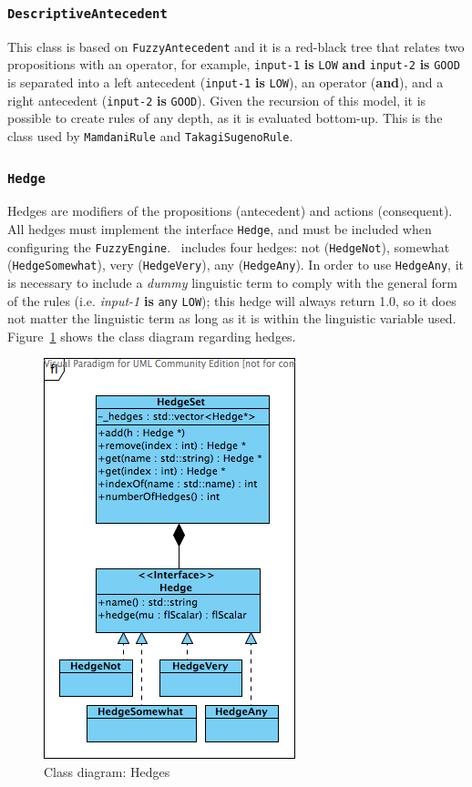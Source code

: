 			
		\subsubsection{\texttt{DescriptiveAntecedent}}
			This class is based on \texttt{FuzzyAntecedent} and it is a red-black tree that relates two propositions with an operator, for example, \texttt{input-1} \textbf{is} \texttt{LOW} \textbf{and}  \texttt{input-2} \textbf{is} \texttt{GOOD} is separated into a left antecedent (\texttt{input-1} \textbf{is} \texttt{LOW}), an operator (\textbf{and}),   and a right antecedent (\texttt{input-2} \textbf{is} \texttt{GOOD}). Given the recursion of  this model, it is possible to create rules of any depth, as it is evaluated bottom-up. This is the class used by \texttt{MamdaniRule} and \texttt{TakagiSugenoRule}.
		
		\subsubsection{\texttt{Hedge}}
			Hedges are modifiers of the propositions (antecedent) and actions (consequent). All hedges must implement the interface \texttt{Hedge}, and must be included when configuring the \texttt{FuzzyEngine}. \fl\ includes four hedges: not (\texttt{HedgeNot}), somewhat (\texttt{HedgeSomewhat}), very (\texttt{HedgeVery}), any (\texttt{HedgeAny}). In order to use \texttt{HedgeAny}, it is necessary to include a \emph{dummy} linguistic term to comply with the general form of the rules (i.e. \emph{input-1} \textbf{is} \texttt{any} \texttt{LOW}); this hedge will always return 1.0, so it does not matter the linguistic term as long as it is within the linguistic variable used. Figure~\ref{f:hedges} shows the class diagram regarding hedges.
			
			\begin{figure}[ht]
				\centering
				\includegraphics[scale=0.65]{./figures/fuzzy-hedges.png}
				\caption{Class diagram: Hedges}
				\label{f:hedges}
			\end{figure}
		
